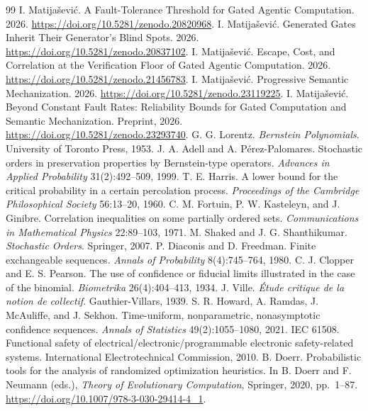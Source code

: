 \documentclass[11pt]{article}
\theoremstyle{definition}
\theoremstyle{remark}
\begin{document}
\begin{thebibliography}{99}
 I. Matija\v{s}evi\'c. A Fault-Tolerance Threshold for Gated Agentic Computation.
2026. \url{https://doi.org/10.5281/zenodo.20820968}.
 I. Matija\v{s}evi\'c. Generated Gates Inherit Their Generator's Blind Spots.
2026. \url{https://doi.org/10.5281/zenodo.20837102}.
 I. Matija\v{s}evi\'c. Escape, Cost, and Correlation at the Verification Floor of
Gated Agentic Computation. 2026. \url{https://doi.org/10.5281/zenodo.21456783}.
 I. Matija\v{s}evi\'c. Progressive Semantic Mechanization. 2026.
\url{https://doi.org/10.5281/zenodo.23119225}.
 I. Matija\v{s}evi\'c. Beyond Constant Fault Rates: Reliability Bounds for Gated Computation and Semantic Mechanization. 
Preprint, 2026. \url{https://doi.org/10.5281/zenodo.23293740}.
 G. G. Lorentz. \emph{Bernstein Polynomials}. University of Toronto Press, 1953.
 J. A. Adell and A. P\'erez-Palomares. Stochastic orders in preservation properties by
Bernstein-type operators. \emph{Advances in Applied Probability} 31(2):492--509, 1999.
 T. E. Harris. A lower bound for the critical probability in a certain percolation
process. \emph{Proceedings of the Cambridge Philosophical Society} 56:13--20, 1960.
 C. M. Fortuin, P. W. Kasteleyn, and J. Ginibre. Correlation inequalities on some
partially ordered sets. \emph{Communications in Mathematical Physics} 22:89--103, 1971.
 M. Shaked and J. G. Shanthikumar. \emph{Stochastic Orders}. Springer, 2007.
 P. Diaconis and D. Freedman. Finite exchangeable sequences.
\emph{Annals of Probability} 8(4):745--764, 1980.
 C. J. Clopper and E. S. Pearson. The use of confidence or fiducial limits
illustrated in the case of the binomial. \emph{Biometrika} 26(4):404--413, 1934.
 J. Ville. \emph{\'Etude critique de la notion de collectif}. Gauthier-Villars, 1939.
 S. R. Howard, A. Ramdas, J. McAuliffe, and J. Sekhon. Time-uniform, nonparametric,
nonasymptotic confidence sequences. \emph{Annals of Statistics} 49(2):1055--1080, 2021.
 IEC 61508. Functional safety of electrical/electronic/programmable electronic
safety-related systems. International Electrotechnical Commission, 2010.
 B. Doerr. Probabilistic tools for the analysis of randomized optimization heuristics.
In B. Doerr and F. Neumann (eds.), \emph{Theory of Evolutionary Computation}, Springer, 2020,
pp.~1--87. \url{https://doi.org/10.1007/978-3-030-29414-4_1}.

\end{thebibliography}
\end{document}
